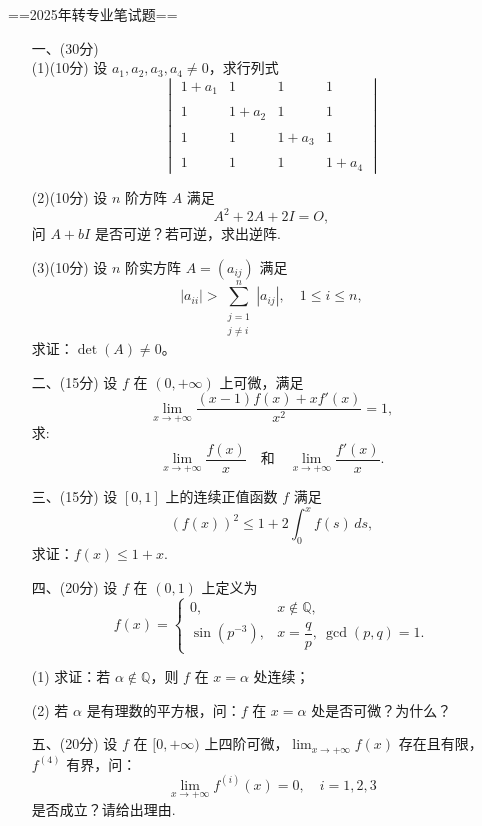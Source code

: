 ==2025年转专业笔试题==
\begin{enumerate}
\item[一、(30分)]
\\
(1)(10分)
设 $a_1, a_2, a_3, a_4 \ne 0$，求行列式
\[
\begin{vmatrix}
 1+a_1 & 1 & 1 & 1 \\ \\
 1 & 1+a_2 & 1 & 1 \\ \\
 1 & 1 & 1+a_3 & 1 \\ \\
 1 & 1 & 1 & 1+a_4
\end{vmatrix}
\]

(2)(10分)
设 $n$ 阶方阵 $A$ 满足
\[
A^2 + 2A + 2I = O,
\]
问 $A + bI$ 是否可逆？若可逆，求出逆阵.

(3)(10分)
设 $n$ 阶实方阵 $A = (a_{ij})$ 满足
\[
|a_{ii}| > \sum_{\substack{j=1 \\ j \ne i}}^{n} |a_{ij}|, \quad 1 \le i \le n,
\]
求证：$\det(A) \ne 0$。

\item[二、(15分)]
设 $f$ 在 $(0, +\infty)$ 上可微，满足
\[
\lim_{x \to +\infty} \frac{(x-1)f(x) + x f'(x)}{x^2} = 1,
\]
求:
\[
\lim_{x \to +\infty} \frac{f(x)}{x}
\quad \text{和} \quad
\lim_{x \to +\infty} \frac{f'(x)}{x}.
\]

\item[三、(15分)]
设 $[0,1]$ 上的连续正值函数 $f$ 满足
\[
(f(x))^2 \le 1 + 2 \int_0^x f(s)\,ds,
\]
求证：$f(x) \le 1 + x$.

\item[四、(20分)]
设 $f$ 在 $(0,1)$ 上定义为
\[
f(x) =
\begin{cases}
0, & x \notin \mathbb{Q}, \\[6pt]
\sin\left(p^{-3}\right), & x = \dfrac{q}{p},\ \gcd(p,q) = 1.
\end{cases}
\]


(1) 求证：若 $\alpha \notin \mathbb{Q}$，则 $f$ 在 $x = \alpha$ 处连续；

(2) 若 $\alpha$ 是有理数的平方根，问：$f$ 在 $x = \alpha$ 处是否可微？为什么？


\item[五、(20分)]
设 $f$ 在 $[0, +\infty)$ 上四阶可微，$\displaystyle\lim_{x \to +\infty} f(x)$ 存在且有限，$f^{(4)}$ 有界，问：
\[
\lim_{x \to +\infty} f^{(i)}(x) = 0, \quad i = 1,2,3
\]
是否成立？请给出理由.

\end{enumerate}


